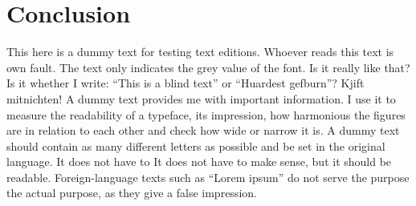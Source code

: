 
\section{Conclusion}%
\label{sec:conclusion} 

This here is a dummy text for testing text editions. Whoever reads this text is
own fault. The text only indicates the grey value of the font. Is it really like that? Is it
whether I write: ``This is a blind text'' or ``Huardest gefburn''? Kjift mitnichten! A dummy text provides me with important information. I use it to measure the readability 
of a typeface, its impression, how harmonious the figures are in relation to each other
and check how wide or narrow it is. A dummy text should contain as many different 
letters as possible and be set in the original language. It does not have to
It does not have to make sense, but it should be readable. Foreign-language texts such as ``Lorem ipsum'' do not serve the purpose 
the actual purpose, as they give a false impression.
